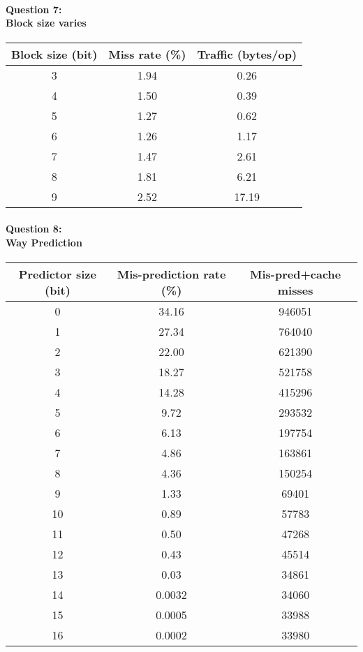 \documentclass[12pt,letterpaper]{article}
\begin{document}
\paragraph*{Question 7:\\Block size varies}
\begin{tabular}{|c|c|c|}
\hline 
Block size (bit) & Miss rate (\%)& Traffic (bytes/op)\\ 
\hline 
3 & 1.94 & 0.26 \\ 
\hline 
4 & 1.50 & 0.39 \\ 
\hline 
5 & 1.27 & 0.62 \\ 
\hline 
6 & 1.26 & 1.17 \\ 
\hline 
7 & 1.47 & 2.61 \\ 
\hline 
8 & 1.81 & 6.21 \\ 
\hline 
9 & 2.52 & 17.19 \\ 
\hline 
\end{tabular} 
\paragraph*{Question 8:\\Way Prediction}
\begin{tabular}{|c|c|c|}
\hline 
Predictor size (bit) & Mis-prediction rate (\%)& Mis-pred+cache misses \\ 
\hline 
0 & 34.16 & 946051 \\ 
\hline 
1 & 27.34 & 764040 \\ 
\hline 
2 & 22.00 & 621390 \\ 
\hline 
3 & 18.27 & 521758 \\ 
\hline 
4 & 14.28 & 415296 \\ 
\hline 
5 & 9.72 & 293532 \\ 
\hline 
6 & 6.13 & 197754 \\ 
\hline 
7 & 4.86 & 163861 \\ 
\hline 
8 & 4.36 & 150254 \\ 
\hline 
9 & 1.33 & 69401 \\ 
\hline 
10 & 0.89 & 57783 \\ 
\hline 
11 & 0.50 & 47268 \\ 
\hline 
12 & 0.43 & 45514 \\ 
\hline 
13 & 0.03 & 34861 \\ 
\hline 
14 & 0.0032 & 34060 \\ 
\hline 
15 & 0.0005 & 33988 \\ 
\hline 
16 & 0.0002 & 33980 \\ 
\hline 
\end{tabular} 
\end{document}
